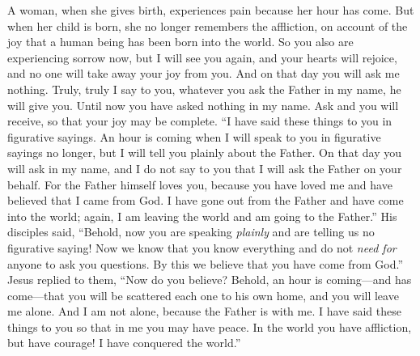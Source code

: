 \begin{biblechapter}
\verse A woman, when she gives birth, experiences pain because her hour has come. But when her child is born, she no longer remembers the affliction, on account of the joy that a human being has been born into the world.
\verse So you also are experiencing sorrow now, but I will see you again, and your hearts will rejoice, and no one will take away your joy from you.
\verse And on that day you will ask me nothing. Truly, truly I say to you, whatever you ask the Father in my name, he will give you.
\verse Until now you have asked nothing in my name. Ask and you will receive, so that your joy may be complete.
 “I have said these things to you in figurative sayings. An hour is coming when I will speak to you in figurative sayings no longer, but I will tell you plainly about the Father.
\verse On that day you will ask in my name, and I do not say to you that I will ask the Father on your behalf.
\verse For the Father himself loves you, because you have loved me and have believed that I came from God.
\verse I have gone out from the Father and have come into the world; again, I am leaving the world and am going to the Father.”
\verse His disciples said, “Behold, now you are speaking \textit{plainly} and are telling us no figurative saying!
\verse Now we know that you know everything and do not \textit{need for} anyone to ask you questions. By this we believe that you have come from God.”
\verse Jesus replied to them, “Now do you believe?
\verse Behold, an hour is coming—and has come—that you will be scattered each one to his own home, and you will leave me alone. And I am not alone, because the Father is with me.
\verse I have said these things to you so that in me you may have peace. In the world you have affliction, but have courage! I have conquered the world.”
\end{biblechapter}

